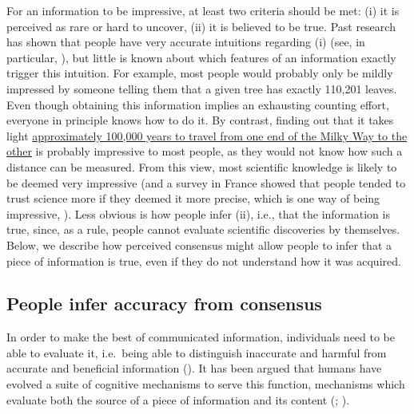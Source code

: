 \documentclass[
  jou,
  floatsintext,
  longtable,
  nolmodern,
  notxfonts,
  notimes,
  colorlinks=true,linkcolor=blue,citecolor=blue,urlcolor=blue]{apa7}
\begin{document}
For an information to be impressive, at least two criteria should be
met: (i) it is perceived as rare or hard to uncover, (ii) it is believed
to be true. Past research has shown that people have very accurate
intuitions regarding (i) (see, in particular,
),
but little is known about which features of an information exactly
trigger this intuition. For example, most people would probably only be
mildly impressed by someone telling them that a given tree has exactly
110,201 leaves. Even though obtaining this information implies an
exhausting counting effort, everyone in principle knows how to do it. By
contrast, finding out that it takes light
\href{https://imagine.gsfc.nasa.gov/features/cosmic/milkyway_info.html}{approximately
100,000 years to travel from one end of the Milky Way to the other} is
probably impressive to most people, as they would not know how such a
distance can be measured. From this view, most scientific knowledge is
likely to be deemed very impressive (and a survey in France showed that
people tended to trust science more if they deemed it more precise,
which is one way of being impressive,
).
Less obvious is how people infer (ii), i.e., that the information is
true, since, as a rule, people cannot evaluate scientific discoveries by
themselves. Below, we describe how perceived consensus might allow
people to infer that a piece of information is true, even if they do not
understand how it was acquired.

\subsection{People infer accuracy from
consensus}\label{people-infer-accuracy-from-consensus}

In order to make the best of communicated information, individuals need
to be able to evaluate it, i.e.~being able to distinguish inaccurate and
harmful from accurate and beneficial information
(). It has been argued that humans have evolved a suite of cognitive
mechanisms to serve this function, mechanisms which evaluate both the
source of a piece of information and its content
(;
).
\end{document}

